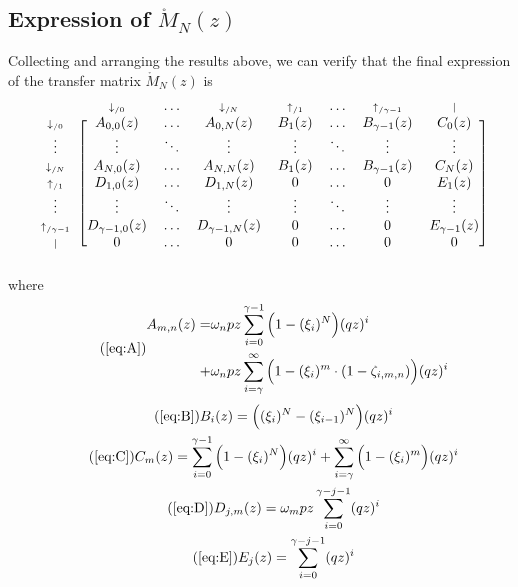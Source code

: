 \documentclass{article}
\newcommand{\dn}[1]{\scriptstyle{\downarrow_{/#1}}}
\newcommand{\up}[1]{\scriptstyle{\uparrow_{/#1}}}
\newcommand{\nd}{\scriptstyle{|}}
\begin{document}
\subsection{Expression of $\mathring{M}_N(z)$}
\label{sec:expression_of_M}

Collecting and arranging the results above, we can verify that the final
expression of the transfer matrix $\mathring{M}_N(z)$ is
\begin{equation*}
\begin{blockarray}{cccccccc}
   & \dn{0} & \ldots & \dn{N} & \up{1} & \ldots & \up{\gamma-1} & \nd \\
\begin{block}{c[ccccccc]}
\dn{0} & A_{0,0}(z) & \ldots & A_{0,N}(z) & B_1(z) & \ldots &
    B_{\gamma-1}(z) & C_0(z) \\
\vdots & \vdots & \ddots & \vdots & \vdots & \ddots &
    \vdots & \vdots \\
\dn{N} & A_{N,0}(z) & \ldots & A_{N,N}(z) & B_1(z) & \ldots &
    B_{\gamma-1}(z) & C_N(z) \\
\up{1} & D_{1,0}(z) & \ldots & D_{1,N}(z) & 0 & \ldots & 0 & E_1(z) \\
\vdots & \vdots & \ddots & \vdots & \vdots & \ddots &
    \vdots & \vdots \\
\up{\gamma-1} & D_{\gamma-1,0}(z) & \ldots & D_{\gamma-1,N}(z) & 0 &
  \ldots & 0 & E_{\gamma-1}(z) \\
\nd & 0 & \ldots & 0 & 0 & \ldots & 0 & 0 \\
\end{block}
\end{blockarray}
\end{equation*}
where
\begin{equation}
\tag{\ref{eq:A}}
\begin{split}
A_{m,n}(z) =
&\omega_n pz \sum_{i=0}^{\gamma-1} \Big(1 - (\xi_i)^N \Big) (qz)^i \\
+ &\omega_n pz \sum_{i=\gamma}^\infty \Big(1 - (\xi_i)^m \cdot
(1- \zeta_{i,m,n}) \Big) (qz)^i 
\end{split}
\end{equation}
\begin{gather}
\tag{\ref{eq:B}}
B_i(z) = \Big( (\xi_i)^N-(\xi_{i-1})^N \Big) (qz)^i \\
\tag{\ref{eq:C}}
C_m(z) =
\sum_{i=0}^{\gamma-1} \Big(1 - (\xi_i)^N \Big) (qz)^i +
  \sum_{i=\gamma}^\infty \Big(1 - (\xi_i)^m \Big) (qz)^i \\
\tag{\ref{eq:D}}
D_{j,m}(z) = \omega_m pz \sum_{i=0}^{\gamma-j-1} (qz)^i \\
\tag{\ref{eq:E}}
E_j(z) = \sum_{i=0}^{\gamma-j-1} (qz)^i
\end{gather}
\end{document}
